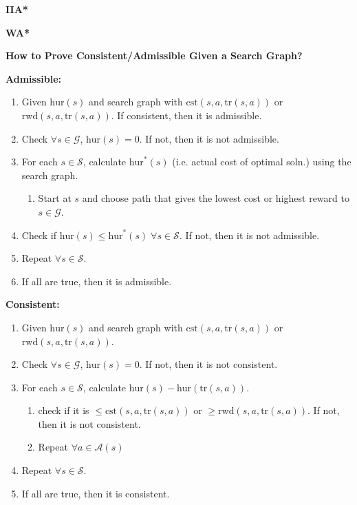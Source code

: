\begin{example} \textbf{IIA*}
    
\end{example}

\begin{example} \textbf{WA*}
    
\end{example}
\newpage

\begin{process} \textbf{How to Prove Consistent/Admissible Given a Search Graph?}
   
    \textbf{Admissible:}
    \begin{enumerate}
        \item Given $\text{hur}(s)$ and search graph with $\text{cst}(s,a,\text{tr}(s,a))$ or $\text{rwd}(s,a,\text{tr}(s,a))$. If consistent, then it is admissible.
        \item Check $\forall s \in \mathcal{G}$, $\text{hur}(s) = 0$. If not, then it is not admissible.
        \item For each $s \in \mathcal{S}$, calculate $\text{hur}^*(s)$ (i.e. actual cost of optimal soln.) using the search graph.
        \begin{enumerate}
            \item Start at $s$ and choose path that gives the lowest cost or highest reward to $s \in \mathcal{G}$. 
        \end{enumerate}
        \item Check if $\text{hur}(s) \leq \text{hur}^*(s) \; \forall s \in \mathcal{S}$. If not, then it is not admissible.
        \item Repeat $\forall s \in \mathcal{S}$. 
        \item If all are true, then it is admissible.
    \end{enumerate}
    \vspace{1em}

    \textbf{Consistent:}
    \begin{enumerate}
        \item Given $\text{hur}(s)$ and search graph with $\text{cst}(s,a,\text{tr}(s,a))$ or $\text{rwd}(s,a,\text{tr}(s,a))$. 
        \item Check $\forall s \in \mathcal{G}$, $\text{hur}(s) = 0$. If not, then it is not consistent.
        \item For each $s \in \mathcal{S}$, calculate $\text{hur}(s) - \text{hur}(\text{tr}(s, a))$.
        \begin{enumerate}
            \item check if it is $\leq \text{cst}(s,a,\text{tr}(s,a))$ or $\geq \text{rwd}(s,a,\text{tr}(s,a))$. If not, then it is not consistent.
            \item Repeat $\forall a \in \mathcal{A}(s)$
        \end{enumerate}
        \item Repeat $\forall s \in \mathcal{S}$.
        \item If all are true, then it is consistent.
    \end{enumerate}
\end{process}

